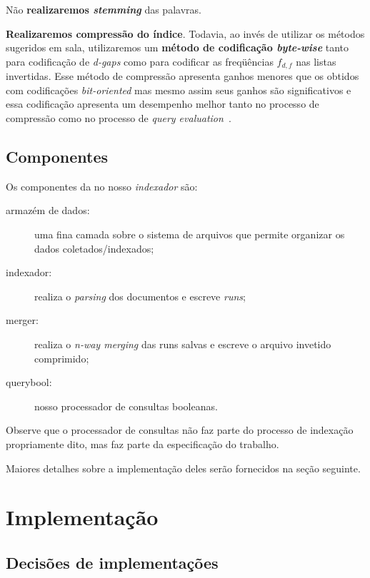 \documentclass[10pt,twocolumn]{article}
\begin{document}
Não \textbf{realizaremos \emph{stemming}} das palavras.

\textbf{Realizaremos compressão do índice}. Todavia, ao invés de
utilizar os métodos sugeridos em sala, utilizaremos um \textbf{método de
codificação \emph{byte-wise}} tanto para codificação de \emph{d-gaps}
como para codificar as freqüências \(f_{d,f}\) nas listas invertidas.
Esse método de compressão apresenta ganhos menores que os obtidos com
codificações \emph{bit-oriented} mas mesmo assim seus ganhos são
significativos e essa codificação apresenta um desempenho melhor tanto
no processo de compressão como no processo de \emph{query
evaluation}~\cite{zobel2002fastquery}.



\subsection{Componentes}


Os componentes da no nosso \emph{indexador} são:
\begin{description}
\item[armazém de dados:] uma fina camada sobre o sistema de arquivos que
permite organizar os dados coletados/indexados;
\item[indexador:] realiza o \emph{parsing} dos documentos e escreve
\emph{runs};
\item[merger:] realiza o \emph{n-way merging} das runs salvas e escreve
o arquivo invetido comprimido;
\item[querybool:] nosso processador de consultas booleanas.
\end{description}


Observe que o processador de consultas não faz parte do processo de
indexação propriamente dito, mas faz parte da especificação do trabalho.

Maiores detalhes sobre a implementação deles serão fornecidos na seção
seguinte.


\section{Implementação}\label{sec:implementation}

\subsection{Decisões de implementações}
\end{document}
